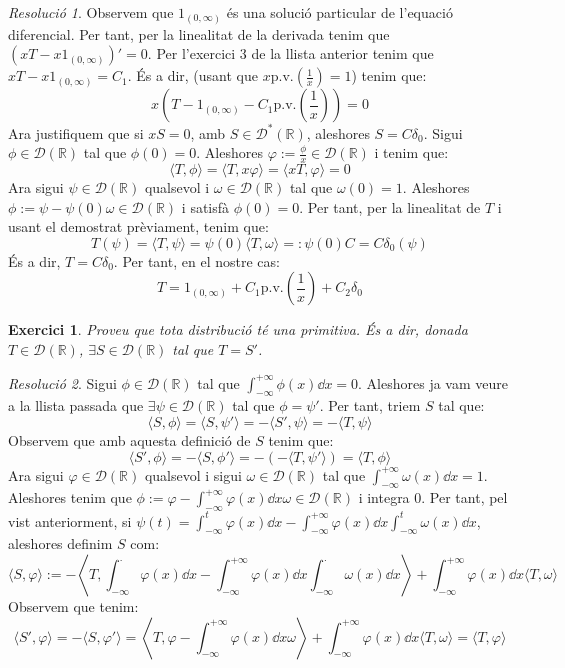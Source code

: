 \documentclass[10pt,a4paper]{article}
\newcommand{\RR}{\ensuremath{\mathbb{R}}} %
\newcommand{\vf}[1]{\boldsymbol{\mathrm{#1}}} %
\newtheorem{exercici}{Exercici}
\theoremstyle{definition}
\theoremstyle{remark}
\newtheorem*{res}{Resolució}
\renewcommand{\pv}{\mathrm{p.v.}} %
\begin{document}
\begin{res}
  Observem que $\vf{1}_{(0,\infty)}$ és una solució particular de l'equació diferencial. Per tant, per la linealitat de la derivada tenim que ${(xT - x\vf{1}_{(0,\infty)})}'=0$. Per l'exercici 3 de la llista anterior tenim que $xT - x\vf{1}_{(0,\infty)}=C_1$. És a dir, (usant que $x\pv\left(\frac{1}{x}\right)=1$) tenim que:
  $$
    x\left(T-\vf{1}_{(0,\infty)}-C_1\pv\left(\frac{1}{x}\right)\right)=0
  $$
  Ara justifiquem que si $xS=0$, amb $S\in\mathcal{D}^*(\RR)$, aleshores $S=C\delta_0$. Sigui $\phi\in\mathcal{D}(\RR)$ tal que $\phi(0)=0$. Aleshores $\varphi:=\frac{\phi}{x}\in\mathcal{D}(\RR)$ i tenim que:
  $$\langle T,\phi\rangle=\langle T,x\varphi\rangle=\langle xT,\varphi\rangle=0$$
  Ara sigui $\psi\in\mathcal{D}(\RR)$ qualsevol i $\omega\in \mathcal{D}(\RR)$ tal que $\omega(0)=1$. Aleshores $\phi:=\psi-\psi(0)\omega\in\mathcal{D}(\RR)$ i satisfà $\phi(0)=0$. Per tant, per la linealitat de $T$ i usant el demostrat prèviament, tenim que:
  $$
    T(\psi)=\langle T,\psi \rangle =\psi(0) \langle T,\omega \rangle =: \psi(0) C=C\delta_0(\psi)
  $$
  És a dir, $T=C\delta_0$. Per tant, en el nostre cas:
  $$
    T=\vf{1}_{(0,\infty)}+C_1\pv\left(\frac{1}{x}\right)+C_2\delta_0
  $$
\end{res}
\begin{exercici}
  Proveu que tota distribució té una primitiva. És a dir, donada $T\in\mathcal{D}(\RR)$, $\exists S\in\mathcal{D}(\RR)$ tal que $T=S'$.
\end{exercici}
\begin{res}
  Sigui $\phi\in\mathcal{D}(\RR)$ tal que $\int_{-\infty}^{+\infty}\phi(x) \dd{x}=0$. Aleshores ja vam veure a la llista passada que $\exists\psi\in \mathcal{D}(\RR)$ tal que $\phi=\psi'$. Per tant, triem $S$ tal que:
  $$
    \langle S,\phi\rangle = \langle S,\psi'\rangle = -\langle S',\psi\rangle = -\langle T,\psi\rangle
  $$
  Observem que amb aquesta definició de $S$ tenim que:
  $$
    \langle S',\phi\rangle = - \langle S, \phi'\rangle =-(-\langle T, \psi' \rangle) = \langle T, \phi \rangle
  $$
  Ara sigui $\varphi\in\mathcal{D}(\RR)$ qualsevol i sigui $\omega\in \mathcal{D}(\RR)$ tal que $\int_{-\infty}^{+\infty}\omega(x) \dd{x}=1$.
  Aleshores tenim que $\phi:=\varphi-\int_{-\infty}^{+\infty}\varphi(x) \dd{x}\omega\in\mathcal{D}(\RR)$ i integra 0. Per tant, pel vist anteriorment, si $\psi(t)=\int_{-\infty}^{t}\varphi(x)\dd{x}-\int_{-\infty}^{+\infty} \varphi(x)\dd{x}\int_{-\infty}^{t}\omega(x)\dd{x}$, aleshores definim $S$ com:
  $$
    \langle S,\varphi \rangle := -\left\langle T, \int_{-\infty}^{\cdot}\varphi(x)\dd{x}-\int_{-\infty}^{+\infty} \varphi(x)\dd{x}\int_{-\infty}^{\cdot}\omega(x)\dd{x} \right\rangle  +\int_{-\infty}^{+\infty}\varphi(x)\dd{x}\langle T,\omega\rangle
  $$
  Observem que tenim:
  $$
    \langle S',\varphi \rangle = -\langle S,\varphi' \rangle = \left\langle T,\varphi-\int_{-\infty}^{+\infty} \varphi(x)\dd{x}\omega \right\rangle +\int_{-\infty}^{+\infty}\varphi(x)\dd{x}\langle T,\omega\rangle= \langle T,\varphi \rangle
  $$
\end{res}
\end{document}
